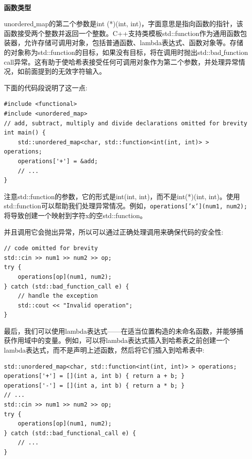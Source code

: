 \noindent\textbf{}\ \par
\textbf{函数类型} \ \par
unordered\underline{ }map的第二个参数是int (*)(int, int)，字面意思是指向函数的指针，该函数接受两个整数并返回一个整数。C++支持类模板std::function作为通用函数包装器，允许存储可调用对象，包括普通函数、lambda表达式、函数对象等。存储的对象称为std::function的目标，如果没有目标，将在调用时抛出std::bad\underline{ }function\underline{ }call异常。这有助于使哈希表接受任何可调用对象作为第二个参数，并处理异常情况，如前面提到的无效字符输入。 \par
下面的代码段说明了这一点: \par

\begin{lstlisting}[caption={}]
#include <functional>
#include <unordered_map>
// add, subtract, multiply and divide declarations omitted for brevity
int main() {
	std::unordered_map<char, std::function<int(int, int)> > operations;
	operations['+'] = &add;
	// ...
}
\end{lstlisting}

注意std::function的参数，它的形式是int(int, int)，而不是int(*)(int, int)。使用std::function可以帮助我们处理异常情况。例如，\texttt{operations['x'](num1, num2);}将导致创建一个映射到字符x的空std::function。 \par
并且调用它会抛出异常，所以可以通过正确处理调用来确保代码的安全性: \par

\begin{lstlisting}[caption={}]
// code omitted for brevity
std::cin >> num1 >> num2 >> op;
try {
	operations[op](num1, num2);
} catch (std::bad_function_call e) {
	// handle the exception
	std::cout << "Invalid operation";
}
\end{lstlisting}

最后，我们可以使用lambda表达式——在适当位置构造的未命名函数，并能够捕获作用域中的变量。例如，可以将lambda表达式插入到哈希表之前创建一个lambda表达式，而不是声明上述函数，然后将它们插入到哈希表中: \par

\begin{lstlisting}[caption={}]
std::unordered_map<char, std::function<int(int, int)> > operations;
operations['+'] = [](int a, int b) { return a + b; }
operations['-'] = [](int a, int b) { return a * b; }
// ...
std::cin >> num1 >> num2 >> op;
try {
	operations[op](num1, num2);
} catch (std::bad_functional_call e) {
	// ...
}
\end{lstlisting}

